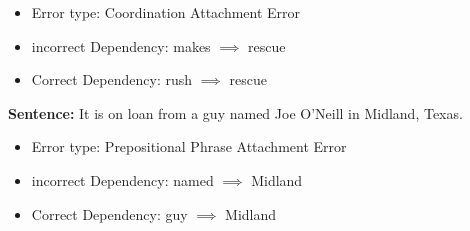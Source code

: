 \documentclass[a4]{article}
\begin{document}
\begin{itemize}
\item Error type: Coordination Attachment Error 
\item incorrect Dependency: makes $\implies$ rescue
\item Correct Dependency: rush $\implies$ rescue
\end{itemize}

\textbf{Sentence: }It is on loan from a guy named Joe O’Neill in Midland, Texas.

\begin{itemize} 
\item Error type: Prepositional Phrase Attachment Error
\item incorrect Dependency: named $\implies$ Midland
\item Correct Dependency: guy $\implies$ Midland
\end{itemize}
\end{document}

